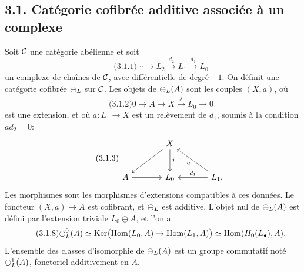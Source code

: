 \documentclass[11pt]{article}
\providecommand{\Ker}{\operatorname{Ker}}
\providecommand{\Hom}{\operatorname{Hom}}
\begin{document}
\subsection*{3.1. Cat\'egorie cofibr\'ee additive associ\'ee \`a un complexe}
Soit \(\mathcal C\) une cat\'egorie ab\'elienne et soit
\begin{equation}\qquad\text{(3.1.1)}
  \cdots\longrightarrow L_2\xrightarrow{d_2}L_1\xrightarrow{d_1}L_0
\end{equation}
un complexe de cha\^ines de \(\mathcal C\), avec diff\'erentielle de degr\'e \(-1\).  On d\'efinit une cat\'egorie cofibr\'ee \(\mathcal\Psi_L\) sur \(\mathcal C\).  Les objets de \(\mathcal\Psi_L(A)\) sont les couples \((X,a)\), o\`u
\begin{equation}\qquad\text{(3.1.2)}
  0\longrightarrow A\longrightarrow X\xrightarrow{j}L_0\longrightarrow0
\end{equation}
est une extension, et o\`u \(a:L_1\to X\) est un rel\`evement de \(d_1\), soumis \`a la condition \(a d_2=0\):
\begin{equation}\qquad\text{(3.1.3)}
\begin{tikzcd}[column sep=large,row sep=large]
& X\arrow[d,"j"]\arrow[dl]&\\
A\arrow[r]&L_0&L_1\arrow[l,"d_1"']\arrow[ul,"a"] .
\end{tikzcd}
\end{equation}
Les morphismes sont les morphismes d'extensions compatibles \`a ces donn\'ees.  Le foncteur \((X,a)\mapsto A\) est cofibrant, et \(\mathcal\Psi_L\) est additive.  L'objet nul de \(\mathcal\Psi_L(A)\) est d\'efini par l'extension triviale \(L_0\oplus A\), et l'on a
\begin{equation}\qquad\text{(3.1.8)}
  \cPsi_L^0(A)\simeq
  \Ker\bigl(\Hom(L_0,A)\to\Hom(L_1,A)\bigr)
  \simeq\Hom(H_0(L_\bullet),A).
\end{equation}
L'ensemble des classes d'isomorphie de \(\mathcal\Psi_L(A)\) est un groupe commutatif not\'e \(\mathcal\Psi_L^1(A)\), fonctoriel additivement en \(A\).
\end{document}
